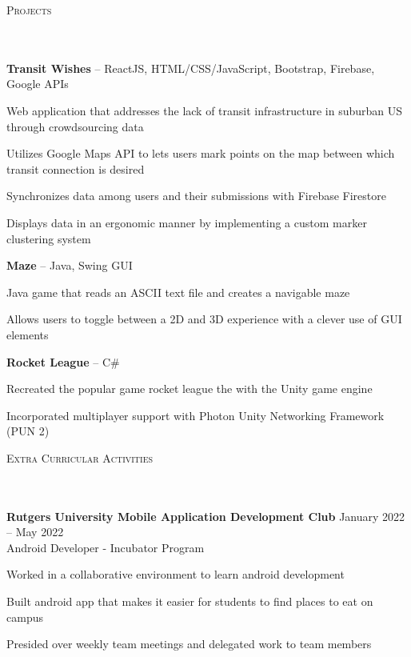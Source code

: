 \documentclass{article}
\newcommand{\header}[1]{{
\hspace*{0pt}\vspace*{6pt} \textsc{#1}} \vspace*{-6pt} 
\lineunder
}
\newcommand{\lineunder}{
\vspace*{-8pt} \\ \hspace*{-3pt} 
\hrulefill \\
}
\newcommand{\employer}[4]{{
\vspace*{2pt}%
\textbf{#1} #2 \hfill #3\\ #4 \vspace*{2pt}}
}
\newcommand{\project}[3]{{
\vspace*{2pt}%
\textbf{#1} #2 \hfill #3\vspace*{2pt}}
}
\renewcommand{\labelitemii}{
$\vcenter{\hbox{\tiny$\bullet$}}$\hspace*{-3pt}
}
\newenvironment{bullet-list-minor}{
\begin{list}{\labelitemii}{\setlength\leftmargin{15pt} 
\topsep 0pt \itemsep -2pt}}{\vspace*{4pt}\end{list}
}
\begin{document}
\vspace*{4pt}%
\header{Projects}
    \project{Transit Wishes}{-- ReactJS, HTML/CSS/JavaScript, Bootstrap, Firebase, Google APIs }{}
    \begin{bullet-list-minor}
    \item Web application that addresses the lack of transit infrastructure in suburban US through crowdsourcing data
    \item Utilizes Google Maps API to lets users mark points on the map between which transit connection is desired
    \item Synchronizes data among users and their submissions with Firebase Firestore
    \item Displays data in an ergonomic manner by implementing a custom marker clustering system
    \end{bullet-list-minor}

    \project{Maze}{-- Java, Swing GUI}{}
	\begin{bullet-list-minor}
	\item Java game that reads an ASCII text file and creates a navigable maze
	\item Allows users to toggle between a 2D and 3D experience with a clever use of GUI elements
    \end{bullet-list-minor}

    \project{Rocket League}{-- C\#}{ }
	\begin{bullet-list-minor}
    \item Recreated the popular game rocket league the with the Unity game engine
    \item Incorporated multiplayer support with Photon Unity Networking Framework (PUN 2)
    \end{bullet-list-minor}

\vspace*{4pt}%

\header{Extra Curricular Activities}

    \employer{Rutgers University Mobile Application Development Club}
    {}{January 2022 -- May 2022}{Android Developer - Incubator Program}
	\begin{bullet-list-minor}
	\item Worked in a collaborative environment to learn android development
	\item Built android app that makes it easier for students to find places to eat on campus
	\item Presided over weekly team meetings and delegated work to team members
    \end{bullet-list-minor}
    
\end{document}
